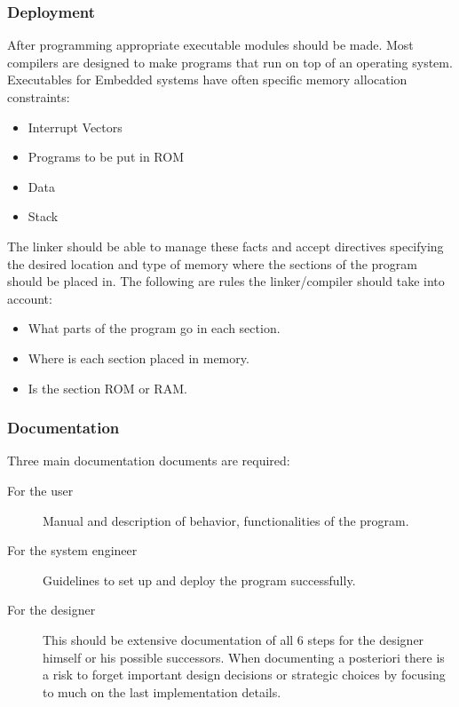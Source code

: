 \documentclass[../main.tex]{subfiles}
\begin{document}
\subsubsection{Deployment}
After programming appropriate executable modules should be made.
Most compilers are designed to make programs that run on top of an operating system.
Executables for Embedded systems have often specific memory allocation constraints:
\begin{itemize}
	\item Interrupt Vectors 
	\item Programs to be put in ROM
	\item Data 
	\item Stack
\end{itemize}
The linker should be able to manage these facts and accept directives specifying the desired location and type of memory where the sections of the program should be placed in. 
The following are rules the linker/compiler should take into account:
\begin{itemize}
	\item What parts of the program go in each section. 
	\item Where is each section placed in memory.
	\item Is the section ROM or RAM.
\end{itemize}

\subsubsection{Documentation}
Three main documentation documents are required:
\begin{description}
	\item[For the user] Manual and description of behavior, functionalities of the program.
	\item[For the system engineer] Guidelines to set up and deploy the program successfully. 
	\item[For the designer] This should be extensive documentation of all 6 steps for the designer himself or his possible successors. When documenting a posteriori there is a risk to forget important design decisions or strategic choices by focusing to much on the last implementation details. 
\end{description}
\end{document}
